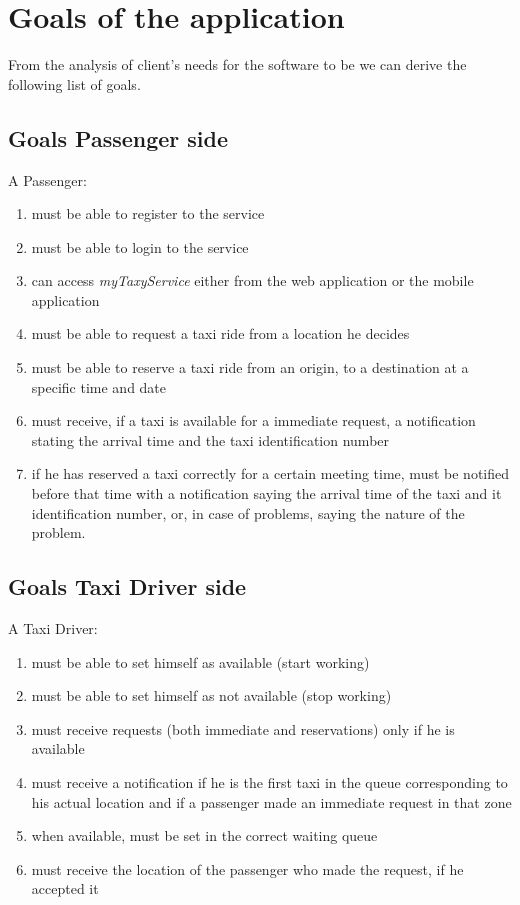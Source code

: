 \section{Goals of the application}
From the analysis of client's needs for the software to be we can derive the following list of goals.
\subsection{Goals Passenger side}
A Passenger:
\begin{enumerate}
\item must be able to register to the service
\item must be able to login to the service
\item can access \textit{myTaxyService} either from the web application or the mobile application
\item must be able to request a taxi ride from a location he decides
\item must be able to reserve a taxi ride from an origin, to a destination at a specific time and date
\item must receive, if a taxi is available for a immediate request, a notification stating the arrival time and the taxi identification number
\item if he has reserved a taxi correctly for a certain meeting time, must be notified before that time with a notification saying the arrival time of the taxi and it identification number, or, in case of problems, saying the nature of the problem.
\end{enumerate}
\subsection{Goals Taxi Driver side}
A Taxi Driver:
\begin{enumerate}
\item must be able to set himself as available (start working) 
\item must be able to set himself as not available (stop working)
\item must receive requests (both immediate and reservations) only if he is available 
\item must receive a notification if he is the first taxi in the queue corresponding to his actual location and if a passenger made an immediate request in that zone
\item when available, must be set in the correct waiting queue
\item must receive the location of the passenger who made the request, if he accepted it
\end{enumerate}

